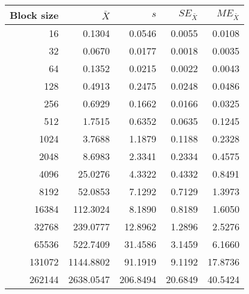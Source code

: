 \begin{tabular}{rrrrr}\toprule
{\small Block size} & $\bar{X}$ & $s$ & $SE_{\bar{X}}$ & $ME_{\bar{X}}$ \\\midrule
16 & 0.1304 & 0.0546 & 0.0055 & 0.0108\\
32 & 0.0670 & 0.0177 & 0.0018 & 0.0035\\
64 & 0.1352 & 0.0215 & 0.0022 & 0.0043\\
128 & 0.4913 & 0.2475 & 0.0248 & 0.0486\\
256 & 0.6929 & 0.1662 & 0.0166 & 0.0325\\
512 & 1.7515 & 0.6352 & 0.0635 & 0.1245\\
1024 & 3.7688 & 1.1879 & 0.1188 & 0.2328\\
2048 & 8.6983 & 2.3341 & 0.2334 & 0.4575\\
4096 & 25.0276 & 4.3322 & 0.4332 & 0.8491\\
8192 & 52.0853 & 7.1292 & 0.7129 & 1.3973\\
16384 & 112.3024 & 8.1890 & 0.8189 & 1.6050\\
32768 & 239.0777 & 12.8962 & 1.2896 & 2.5276\\
65536 & 522.7409 & 31.4586 & 3.1459 & 6.1660\\
131072 & 1144.8802 & 91.1919 & 9.1192 & 17.8736\\
262144 & 2638.0547 & 206.8494 & 20.6849 & 40.5424\\
\bottomrule
\end{tabular}
